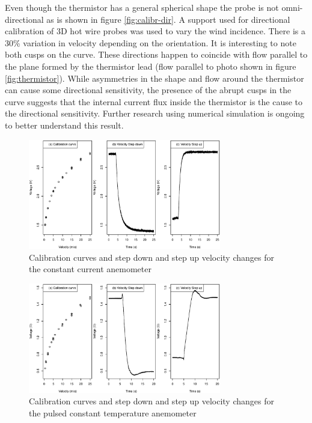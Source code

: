 \documentclass[10pt,fleqn,a4paper,twoside]{article}
\begin{document}
Even though the thermistor has a general spherical shape the probe is not omni-directional as is shown in figure \ref{fig:calibr-dir}. A support used for directional calibration of 3D hot wire probes was used to vary the wind incidence. There is a 30\% variation in velocity depending on the orientation. It is interesting to note both cusps on the curve. These directions happen to coincide with flow parallel to the plane formed by the thermistor lead (flow parallel to photo shown in figure \ref{fig:thermistor}). While asymmetries in the shape and flow around the thermistor can cause some directional sensitivity, the presence of the abrupt cusps in the curve suggests that the internal current flux inside the thermistor is the cause to the directional sensitivity. Further research using numerical simulation is ongoing to better understand this result.

\begin{figure}[h!]
\centering
\includegraphics[width=0.75\textwidth]{../../figures/cca-cal.pdf}
\caption{Calibration curves and step down and step up velocity changes for the constant current anemometer}
\label{fig:calibr-cca}
\end{figure}


\begin{figure}[h!]
\centering
\includegraphics[width=0.75\textwidth]{../../figures/cta-cal.pdf}
\caption{Calibration curves and step down and step up velocity changes for the pulsed constant temperature anemometer}
\label{fig:calibr-cta}
\end{figure}
\end{document}
